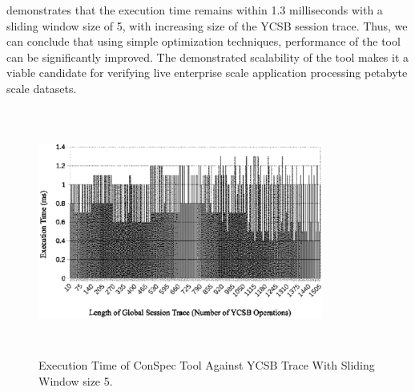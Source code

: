 \documentclass[journal,compsoc]{IEEEtran}
\begin{document}
  demonstrates that the execution time remains within %
   1.3 milliseconds with a sliding window size of %
  5, %
  with increasing size of the YCSB session trace. Thus, we can conclude that using simple optimization techniques, performance of the tool can be significantly improved. The demonstrated scalability of the tool makes it a  viable candidate for verifying live enterprise scale application processing petabyte scale datasets. 

\begin{figure}%
        \includegraphics[width=3.7in,height=3.2in]
                    {conspecExecutionTimes.eps} %
        \caption{Execution Time of ConSpec Tool Against YCSB Trace With Sliding Window size 5.}
        \label{fig:exampleIter}
\end{figure}
\end{document}
